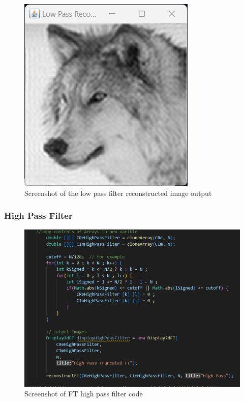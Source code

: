       \begin{figure}[H]
        \centering
        \includegraphics[width=0.8\columnwidth]{Figures/Week 1/W1-Low-Pass-Reconstructed.png}
        \caption{Screenshot of the low pass filter reconstructed image output}
        \label{fig:Low-Pass-Filter-Image}
      \end{figure}
    
    
    \subsubsection{High Pass Filter}
    
      \begin{figure}[H]
        \centering
        \includegraphics[width=1\columnwidth]{Figures/Week 1/W1-High-Pass-Code.png}
        \caption{Screenshot of FT high pass filter code}
        \label{fig:High-Pass-Filter-code}
      \end{figure}

